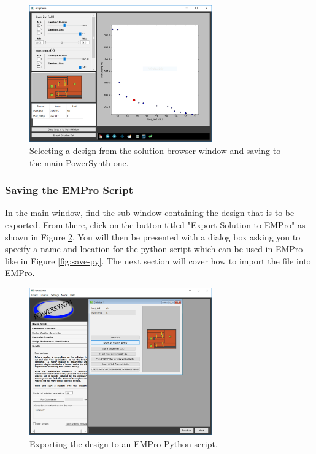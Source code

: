 \documentclass[11pt]{article}
\begin{document}
\begin{figure}[htb]
\centering
\includegraphics[width=0.7\textwidth]{./figs/empro/01_SolutionBrowser.PNG}
\caption{\label{fig:soln-browse}Selecting a design from the solution browser window and saving to the main PowerSynth one.}
\end{figure}


\subsubsection{Saving the EMPro Script}
\label{sec-5-2-2}

In the main window, find the sub-window containing the design that is to be exported. From there, click on the button titled "Export Solution to EMPro" as shown in Figure \ref{fig:export}. You will then be presented with a dialog box asking you to specify a name and location for the python script which can be used in EMPro like in Figure \ref{fig:save-py}. The next section will cover how to import the file into EMPro.


\begin{figure}[htb]
\centering
\includegraphics[width=0.7\textwidth]{./figs/empro/02_ExportSolution.PNG}
\caption{\label{fig:export}Exporting the design to an EMPro Python script.}
\end{figure}
\end{document}

